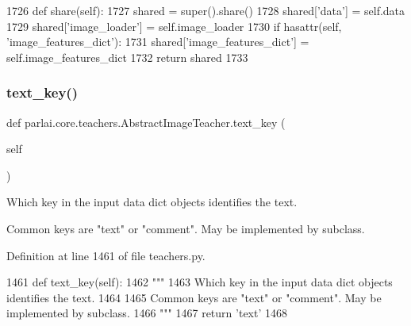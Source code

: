 \begin{DoxyCode}
1726     \textcolor{keyword}{def }share(self):
1727         shared = super().share()
1728         shared[\textcolor{stringliteral}{'data'}] = self.data
1729         shared[\textcolor{stringliteral}{'image\_loader'}] = self.image\_loader
1730         \textcolor{keywordflow}{if} hasattr(self, \textcolor{stringliteral}{'image\_features\_dict'}):
1731             shared[\textcolor{stringliteral}{'image\_features\_dict'}] = self.image\_features\_dict
1732         \textcolor{keywordflow}{return} shared
1733 \end{DoxyCode}
\mbox{\label{classparlai_1_1core_1_1teachers_1_1AbstractImageTeacher_a95e578f9650f77c1d397319b9050af51}} 
\subsubsection{\texorpdfstring{text\+\_\+key()}{text\_key()}}
{\footnotesize\ttfamily def parlai.\+core.\+teachers.\+Abstract\+Image\+Teacher.\+text\+\_\+key (\begin{DoxyParamCaption}\item[{}]{self }\end{DoxyParamCaption})}

\begin{DoxyVerb}Which key in the input data dict objects identifies the text.

Common keys are "text" or "comment". May be implemented by subclass.
\end{DoxyVerb}
 

Definition at line 1461 of file teachers.\+py.


\begin{DoxyCode}
1461     \textcolor{keyword}{def }text\_key(self):
1462         \textcolor{stringliteral}{"""}
1463 \textcolor{stringliteral}{        Which key in the input data dict objects identifies the text.}
1464 \textcolor{stringliteral}{}
1465 \textcolor{stringliteral}{        Common keys are "text" or "comment". May be implemented by subclass.}
1466 \textcolor{stringliteral}{        """}
1467         \textcolor{keywordflow}{return} \textcolor{stringliteral}{'text'}
1468 
\end{DoxyCode}


